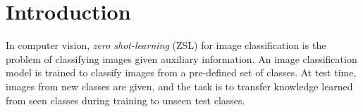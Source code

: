 \documentclass[11pt,a4paper]{article}
\newcommand\gal[1]{\textcolor{bright}{\textbf{GAL:} #1 }}
\begin{document}
\begin{abstract}



\end{abstract}





\section{Introduction}

In computer vision, {\em zero shot-learning} (ZSL) for image classification is the problem of classifying images given auxiliary information. An image classification model is trained to classify images from a pre-defined set of classes. At test time, images from new classes are given, and the task is to transfer knowledge learned from seen classes during training to unseen test classes. 
\end{document}
